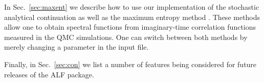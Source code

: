 In Sec.~\ref{sec:maxent}  we  describe how to use our implementation of the stochastic analytical  continuation \cite{Sandvik98,Beach04a} as well as the maximum entropy method \cite{Jarrell96,Linden95}. These methods allow one to obtain spectral functions from imaginary-time correlation functions measured in the QMC simulations.  One can switch between both methods by merely changing a parameter in the input file. 

Finally, in Sec.~\ref{sec:con} we list a number of features being considered for  future releases of the ALF package.

